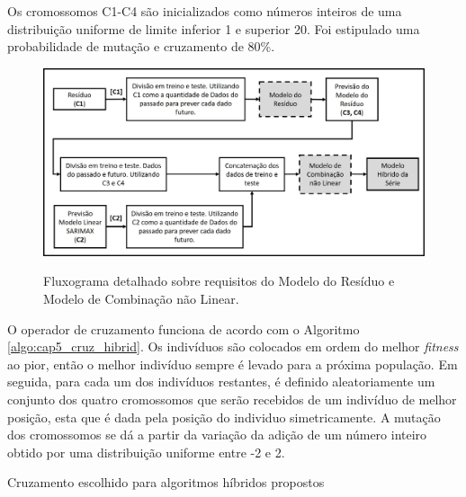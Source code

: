Os cromossomos C1-C4 são inicializados como números inteiros de uma distribuição uniforme de limite inferior 1 e superior 20. Foi estipulado uma probabilidade de mutação e cruzamento de 80\%.

\begin{figure}[!bp]
    \centering
    \caption{Fluxograma detalhado sobre requisitos do Modelo do Resíduo e Modelo de Combinação não Linear.}
    \includegraphics[width=\textwidth]{Figuras/cap5/fluxograma_modelos_res_comb.jpg}
    \label{fig:cap5_fluxograma_modelos_res_comb}
\end{figure}

O operador de cruzamento funciona de acordo com o Algoritmo \ref{algo:cap5_cruz_hibrid}. Os indivíduos são colocados em ordem do melhor \textit{fitness} ao pior, então o melhor indivíduo sempre é levado para a próxima população. Em seguida, para cada um dos indivíduos restantes, é definido aleatoriamente um conjunto dos quatro cromossomos que serão recebidos de um indivíduo de melhor posição, esta que é dada pela posição do individuo simetricamente. A mutação dos cromossomos se dá a partir da variação da adição de um número inteiro obtido por uma distribuição uniforme entre -2 e 2.

\begin{algorithm}[!htbp]
    \caption{Cruzamento escolhido para algoritmos híbridos propostos}
    \label{algo:cap5_cruz_hibrid}
\end{algorithm}

